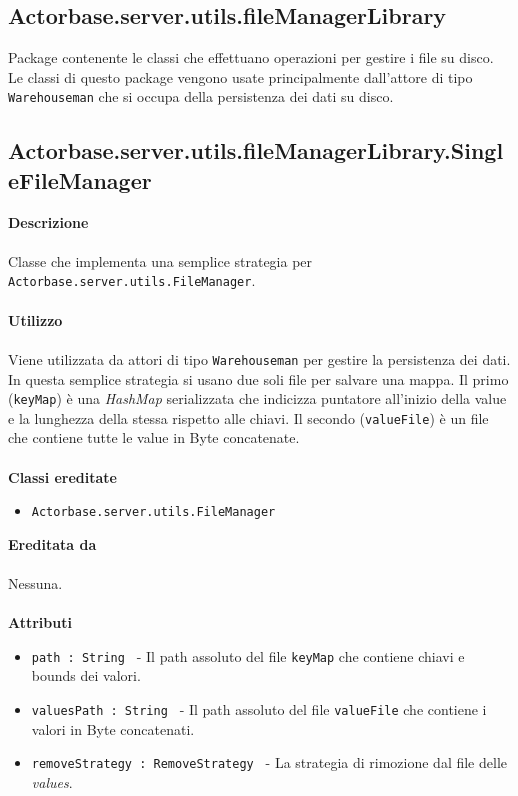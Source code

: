 \documentclass[a4paper]{article}
\begin{document}
		\subsection{Actorbase.server.utils.fileManagerLibrary}
		Package contenente le classi che effettuano operazioni per gestire i file su disco. Le classi di questo package vengono usate principalmente dall'attore di tipo \texttt{Warehouseman} che si occupa della persistenza dei dati su disco.	
			
	\subsection{Actorbase.server.utils.fileManagerLibrary.SingleFileManager}
		\textbf{Descrizione}
			\\ \\
			Classe che implementa una semplice strategia per \texttt{Actorbase.server.utils.FileManager}.
			\\ \\
		\textbf{Utilizzo}
			\\ \\
			Viene utilizzata da attori di tipo \texttt{Warehouseman} per gestire la persistenza dei dati. In questa semplice strategia si usano due soli file per salvare una mappa. Il primo (\texttt{keyMap}) è una \emph{HashMap} serializzata che indicizza puntatore all'inizio della value e la lunghezza della stessa rispetto alle chiavi. Il secondo (\texttt{valueFile}) è un file che contiene tutte le value in Byte concatenate.
			\\ \\
		\textbf{Classi ereditate}
			\begin{itemize}
			 	\item \texttt{Actorbase.server.utils.FileManager}
			\end{itemize}
		\textbf{Ereditata da}
			\\ \\
			Nessuna.
			\\ \\
		\textbf{Attributi}
			\begin{itemize}
				\item \texttt{path : String } - Il path assoluto del file \texttt{keyMap} che contiene chiavi e bounds dei valori.
				\item \texttt{valuesPath : String } - Il path assoluto del file \texttt{valueFile} che contiene i valori in Byte concatenati.
				\item \texttt{removeStrategy : RemoveStrategy } - La strategia di rimozione dal file delle \emph{values}.			
			\end{itemize}	
\end{document}
